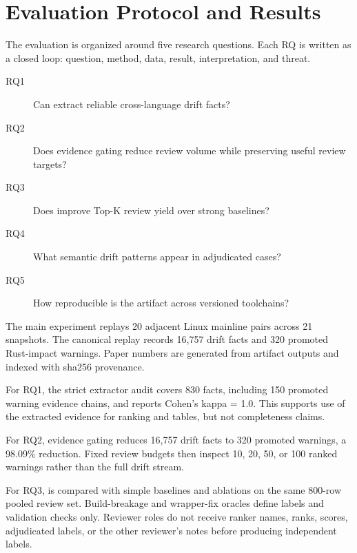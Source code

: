 \section{Evaluation Protocol and Results}

The evaluation is organized around five research questions. Each RQ is written
as a closed loop: question, method, data, result, interpretation, and threat.

\begin{description}
\item[RQ1] Can \tool{} extract reliable cross-language drift facts?
\item[RQ2] Does evidence gating reduce review volume while preserving useful
review targets?
\item[RQ3] Does \primary{} improve Top-K review yield over strong baselines?
\item[RQ4] What semantic drift patterns appear in adjudicated cases?
\item[RQ5] How reproducible is the artifact across versioned toolchains?
\end{description}

The main experiment replays 20 adjacent Linux mainline pairs across 21
snapshots. The canonical replay records 16,757 drift facts and 320 promoted
Rust-impact warnings. Paper numbers are generated from artifact outputs and
indexed with sha256 provenance.



For RQ1, the strict extractor audit covers 830 facts, including 150 promoted
warning evidence chains, and reports Cohen's kappa = 1.0. This supports use of
the extracted evidence for ranking and tables, but not completeness claims.



For RQ2, evidence gating reduces 16,757 drift facts to 320 promoted warnings, a
98.09\% reduction. Fixed review budgets then inspect 10, 20, 50, or 100 ranked
warnings rather than the full drift stream.



For RQ3, \primary{} is compared with simple baselines and ablations on the same
800-row pooled review set. Build-breakage and wrapper-fix oracles define labels
and validation checks only. Reviewer roles do not receive ranker names, ranks,
scores, adjudicated labels, or the other reviewer's notes before producing
independent labels.



